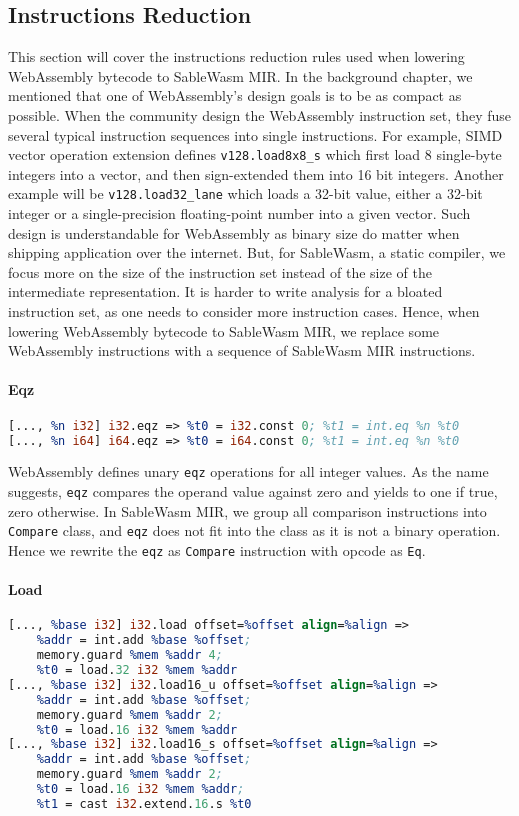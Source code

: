 \subsection{Instructions Reduction}

This section will cover the instructions reduction rules used when lowering WebAssembly bytecode to SableWasm MIR. In the background chapter, we mentioned that one of WebAssembly's design goals is to be as compact as possible. When the community design the WebAssembly instruction set, they fuse several typical instruction sequences into single instructions. For example, SIMD vector operation extension defines \texttt{v128.load8x8\_s} which first load 8 single-byte integers into a vector, and then sign-extended them into 16 bit integers. Another example will be \texttt{v128.load32\_lane} which loads a 32-bit value, either a 32-bit integer or a single-precision floating-point number into a given vector. Such design is understandable for WebAssembly as binary size do matter when shipping application over the internet. But, for SableWasm, a static compiler, we focus more on the size of the instruction set instead of the size of the intermediate representation. It is harder to write analysis for a bloated instruction set, as one needs to consider more instruction cases. Hence, when lowering WebAssembly bytecode to SableWasm MIR, we replace some WebAssembly instructions with a sequence of SableWasm MIR instructions.


\paragraph{Eqz} \quad
\begin{lstlisting}[basicstyle=\linespread{1}\small, language=LLVM]
[..., %n i32] i32.eqz => %t0 = i32.const 0; %t1 = int.eq %n %t0
[..., %n i64] i64.eqz => %t0 = i64.const 0; %t1 = int.eq %n %t0
\end{lstlisting}
WebAssembly defines unary \texttt{eqz} operations for all integer values. As the name suggests, \texttt{eqz} compares the operand value against zero and yields to one if true, zero otherwise. In SableWasm MIR, we group all comparison instructions into \texttt{Compare} class, and \texttt{eqz} does not fit into the class as it is not a binary operation. Hence we rewrite the \texttt{eqz} as \texttt{Compare} instruction with opcode as \texttt{Eq}.

\paragraph{Load} \quad
\begin{lstlisting}[basicstyle=\linespread{1}\small, language=LLVM]
[..., %base i32] i32.load offset=%offset align=%align =>
    %addr = int.add %base %offset;
    memory.guard %mem %addr 4;
    %t0 = load.32 i32 %mem %addr
[..., %base i32] i32.load16_u offset=%offset align=%align =>
    %addr = int.add %base %offset;
    memory.guard %mem %addr 2;
    %t0 = load.16 i32 %mem %addr
[..., %base i32] i32.load16_s offset=%offset align=%align =>
    %addr = int.add %base %offset;
    memory.guard %mem %addr 2;
    %t0 = load.16 i32 %mem %addr;
    %t1 = cast i32.extend.16.s %t0
\end{lstlisting}

